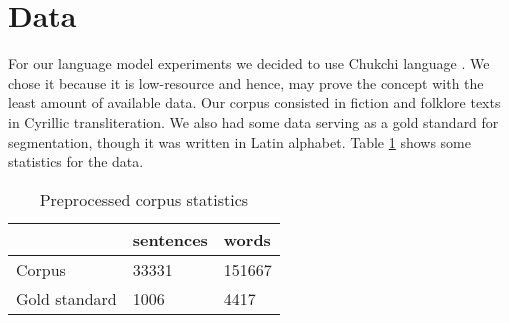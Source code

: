 \documentclass[leqno]{article}
\begin{document}
\section{Data}

For our language model experiments we decided to use Chukchi language \parencite{chukchicorpus}.
We chose it because it is low-resource and hence, may prove the concept with the least amount of available data. Our corpus consisted in fiction and folklore texts in Cyrillic transliteration. We also had some data serving as a gold standard for segmentation, though it was written in Latin alphabet. Table \ref{tab:preproc} shows some statistics for the data.

\begin{table}[h]
\centering
\begin{tabular}{|l|l|l|}
\hline
{\color[HTML]{000000} }              & {\color[HTML]{000000} sentences} & {\color[HTML]{000000} words}  \\ \hline
{\color[HTML]{000000} Corpus}        & {\color[HTML]{000000} 33331}     & {\color[HTML]{000000} 151667} \\ \hline
{\color[HTML]{000000} Gold standard} & {\color[HTML]{000000} 1006}      & {\color[HTML]{000000} 4417}   \\ \hline
\end{tabular}
\caption{Preprocessed corpus statistics}
\label{tab:preproc}
\end{table}
\end{document}
